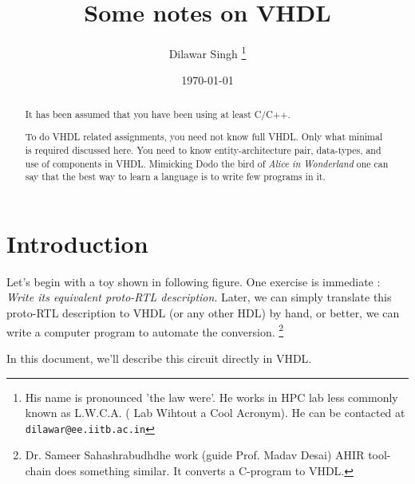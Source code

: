 \documentclass[a4paper,10pt]{article}
\title{Some notes on VHDL}
\author{Dilawar Singh \footnote{His name is pronounced 'the law were'. He works
in HPC lab less commonly known as L.W.C.A. ( Lab Wihtout a Cool Acronym). He
can be contacted at \texttt{dilawar@ee.iitb.ac.in}}}
\date{\today}
\begin{document}
\maketitle

\begin{abstract}
  
  It has been assumed that you have been using at least C/C++. 
  
  To do VHDL related assignments, you need not know full VHDL.  Only what
  minimal is required discussed here. You need to know entity-architecture pair,
  data-types, and use of components in VHDL. Mimicking Dodo the bird of
  \emph{Alice in Wonderland} one can say that the best way to learn a language
  is to write few programs in it. 

\end{abstract}

\section{Introduction}
  
 Let's begin with a toy shown in following figure. One exercise is immediate :
 \emph{Write its equivalent proto-RTL description}. Later, we can simply
 translate this proto-RTL description to VHDL (or any other HDL) by hand, or
 better, we can write a computer program to automate the conversion.
 \footnote{Dr. Sameer Sahashrabudhdhe work (guide Prof. Madav Desai) AHIR
 tool-chain does something similar. It converts a C-program to VHDL.}

 In this document, we'll describe this circuit directly in VHDL.
 
\end{document}
